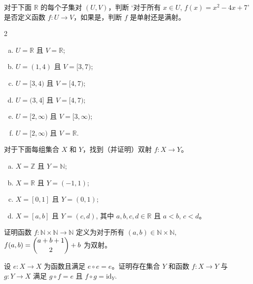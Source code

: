 \begin{chapex}
\label{cqInjectionSurjectionBijection}
对于下面 $\mathbb{R}$ 的每个子集对 $(U,V)$，判断 `对于所有 $x \in U$, $f(x) = x^2-4x+7$' 是否定义函数 $f : U \to V$，如果是，判断 $f$ 是单射还是满射。
\begin{multicols}{2}
\begin{enumerate}[(a)]
\item $U = \mathbb{R}$ 且 $V = \mathbb{R}$;
\item $U = (1, 4)$ 且 $V = [3, 7)$;
\item $U = [3, 4)$ 且 $V = [4, 7)$;
\item $U = (3, 4]$ 且 $V = [4, 7)$;
\item $U = [2, \infty)$ 且 $V = [3, \infty)$;
\item $U = [2,\infty)$ 且 $V = \mathbb{R}$.
\end{enumerate}
\end{multicols}
\end{chapex}

\begin{chapex}
对于下面每组集合 $X$ 和 $Y$，找到（并证明）双射 $f : X \to Y$。
\begin{enumerate}[(a)]
\item $X = \mathbb{Z}$ 且 $Y = \mathbb{N}$;
\item $X = \mathbb{R}$ 且 $Y = (-1,1)$;
\item $X = [0,1]$ 且 $Y = (0,1)$;
\item $X = [a,b]$ 且 $Y = (c,d)$, 其中 $a,b,c,d \in \mathbb{R}$ 且 $a<b$, $c<d$。
\end{enumerate}
\end{chapex}

\begin{chapex}
证明函数 $f : \mathbb{N} \times \mathbb{N} \to \mathbb{N}$ 定义为对于所有 $(a,b) \in \mathbb{N} \times \mathbb{N}$, $f(a,b) = \dbinom{a+b+1}{2} + b$ 为双射。
\end{chapex}

\begin{chapex}
设 $e : X \to X$ 为函数且满足 $e \circ e = e$。证明存在集合 $Y$ 和函数 $f : X \to Y$ 与 $g : Y \to X$ 满足 $g \circ f = e$ 且 $f \circ g = \mathrm{id}_Y$.
\end{chapex}

